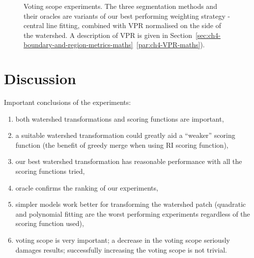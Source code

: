 \begin{figure}[ht!]
\centering
\caption[Voting scope experiments.]{Voting scope experiments. The three segmentation methods and their oracles are variants of our best performing weighting strategy - central line fitting, combined with VPR normalised on the side of the watershed. A description of VPR is given in Section~\ref*{sec:ch4-boundary-and-region-metrics-maths}~\ref{par:ch4-VPR-maths}).}
\label{fig:voting-scope-line-centre-VPR-ws}
\end{figure}

\section{Discussion}

Important conclusions of the experiments:
\begin{enumerate}
 \item both watershed transformations and scoring functions are important,
 \item a suitable %
 watershed transformation could greatly aid a ``weaker'' scoring function (\eg the benefit of greedy merge when using RI scoring function),
 \item our best watershed transformation has reasonable performance with all the scoring functions tried,
 \item oracle confirms the ranking of our experiments,
 \item simpler models work better for transforming the watershed patch (\eg quadratic and polynomial fitting are the worst performing experiments regardless of the scoring function used),
 \item voting scope is very important; a decrease in the voting scope seriously damages results; successfully increasing the voting scope is not trivial.
\end{enumerate}